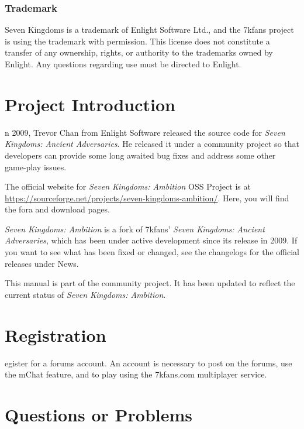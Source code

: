 \documentclass[openany]{book}
\begin{document}
\subsubsection*{Trademark}

Seven Kingdoms is a trademark of Enlight Software Ltd., and the 7kfans project is using the trademark with permission. This license does not constitute a transfer of any ownership, rights, or authority to the trademarks owned by Enlight. Any questions regarding use must be directed to Enlight.

\clearpage

\section*{Project Introduction}

n 2009, Trevor Chan from Enlight Software released the source code for \textit{Seven Kingdoms: Ancient Adversaries}. He released it under a community project so that developers can provide some long awaited bug fixes and address some other game-play issues.

The official website for \textit{Seven Kingdoms: Ambition} OSS Project is at
\url{https://sourceforge.net/projects/seven-kingdoms-ambition/}.  Here, you will
find the fora and download pages.

\textit{Seven Kingdoms: Ambition} is a fork of 7kfans' \textit{Seven Kingdoms:
  Ancient Adversaries}, which has been under active development since its
release in 2009.  If you want to see what has been fixed or changed, see the
changelogs for the official releases under News.

This manual is part of the community project. It has been updated to reflect the
current status of \textit{Seven Kingdoms: Ambition}.

\section*{Registration}


egister for a forums account. An account is necessary to post on the forums, use the mChat feature, and to play using the 7kfans.com multiplayer service.

\section*{Questions or Problems}
\end{document}
